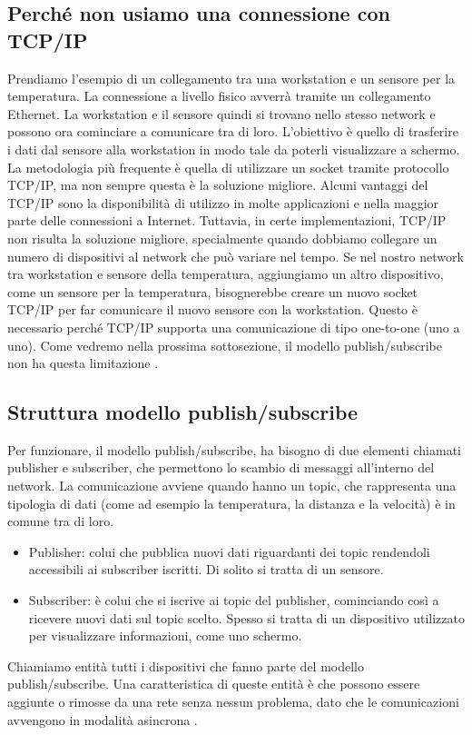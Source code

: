 \subsection{Perché non usiamo una connessione con TCP/IP}
Prendiamo l'esempio di un collegamento tra una workstation e 
un sensore per la temperatura. La connessione a livello fisico
avverrà tramite un collegamento Ethernet. La workstation e il 
sensore quindi si trovano nello stesso network e possono 
ora cominciare a comunicare tra di loro. L'obiettivo è quello
di trasferire i dati dal sensore alla workstation in modo tale
da poterli visualizzare a schermo.
La metodologia più frequente è quella di utilizzare un socket tramite 
protocollo TCP/IP, ma non sempre questa è la soluzione migliore.
Alcuni vantaggi del TCP/IP sono la disponibilità di utilizzo 
in molte applicazioni e nella maggior parte 
delle connessioni a Internet.
Tuttavia, in certe implementazioni, TCP/IP non risulta la soluzione migliore,
specialmente quando dobbiamo collegare un numero di dispositivi al 
network che può variare nel tempo. Se nel nostro network tra workstation e 
sensore della temperatura, aggiungiamo un altro dispositivo, come un 
sensore per la temperatura, bisognerebbe creare un nuovo socket 
TCP/IP per far comunicare il nuovo sensore con la workstation.
Questo è necessario perché TCP/IP supporta una comunicazione di tipo 
one-to-one (uno a uno). Come vedremo nella prossima sottosezione,
il modello publish/subscribe non ha questa limitazione \cite{1494965}.

\subsection{Struttura modello publish/subscribe}
Per funzionare, il modello publish/subscribe, ha bisogno di
due elementi chiamati publisher e subscriber, 
che permettono lo scambio di messaggi all'interno del network.
La comunicazione avviene 
quando hanno un topic, che
rappresenta una tipologia di dati (come ad esempio la temperatura, 
la distanza e la velocità) è in comune tra di loro.
\begin{itemize}
    \item Publisher: colui che pubblica nuovi dati riguardanti dei
    topic rendendoli accessibili ai subscriber iscritti. 
    Di solito si tratta di un sensore.
    \item Subscriber: è colui che si iscrive ai topic del publisher, 
    cominciando
    così a ricevere nuovi dati sul topic scelto. Spesso si tratta
    di un dispositivo utilizzato per visualizzare informazioni, come uno
    schermo.
\end{itemize}
Chiamiamo entità tutti i dispositivi che fanno parte del modello 
publish/subscribe.
Una caratteristica di queste entità è che possono essere aggiunte o rimosse
da una rete senza nessun problema, dato che le 
comunicazioni avvengono in modalità asincrona \cite{dds1.4}. 

